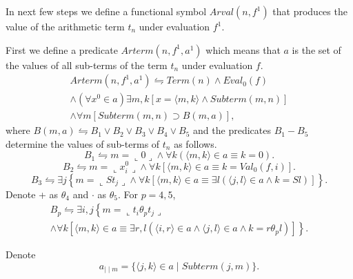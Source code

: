 \documentclass{asl}
\theoremstyle{definition}
\begin{document}
In next few steps we define a functional symbol $Arval(n,f^1)$ that produces the value of the arithmetic term $t_n$ under evaluation $f^1$.

First we define a predicate $Arterm(n,f^1, a^1)$ which means that $a$ is the set of the values of all sub-terms of the term $t_n$ under evaluation $f$.
\begin{multline*}
Arterm(n,f^1, a^1)\leftrightharpoons 
Term(n)\wedge Eval_0(f)
\\
\wedge (\forall x^0\in a)\exists m,k\left[x=\langle m,k\rangle \wedge Subterm(m,n)\right] 
\\
\wedge
\forall m\left[Subterm(m,n)\supset B(m,a)\right], 
\end{multline*}
where $B(m,a)\leftrightharpoons B_1\vee B_2\vee B_3\vee B_4\vee B_5$ and the predicates $B_1 - B_5$ determine the values of sub-terms of $t_n$ as follows.
\[B_1\leftrightharpoons m=\llcorner 0\lrcorner \wedge
\forall k (\langle m,k\rangle \in a\equiv k=0).\]
\[B_2\leftrightharpoons m=\llcorner x_i^0\lrcorner \wedge
\forall k\left[\langle m,k\rangle \in a\equiv k=Val_0(f,i)\right] .\]
\[B_3\leftrightharpoons \exists j \left\lbrace m=\llcorner St_j\lrcorner 
\wedge\forall k\left[\langle m,k\rangle \in a\equiv 
\exists l(\langle j,l\rangle \in a \wedge k=Sl)
\right]\right\rbrace  .\]
Denote + as $\theta_4$ and $\cdot$ as $\theta_5$. For $p=4,5$,
\begin{multline*}
B_p\leftrightharpoons \exists i,j \left\lbrace m=\llcorner t_i \theta_p t_j\lrcorner 
\right.
\\ 
\left.
\wedge\forall k\left[\langle m,k\rangle \in a\equiv 
\exists r,l(\langle i,r\rangle \in a \wedge \langle j,l\rangle \in a \wedge k=r \theta_p l)
\right]\right\rbrace  .
\end{multline*}

Denote 
\[a_{\mid\mid m}=\lbrace\langle j,k\rangle\in a\mid Subterm(j,m)\rbrace.\]
\end{document}
